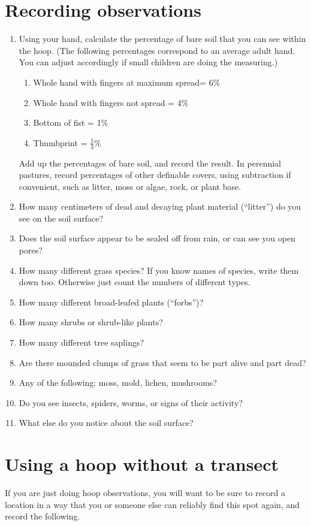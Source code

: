 \documentclass[11pt,letterpaper,twoside,onecolumn]{memoir}
\begin{document}
\section*{Recording observations}
\begin{enumerate}
\item {Using your hand, calculate the percentage of bare soil that you can see within the hoop. (The following percentages correspond to an average adult hand. You can adjust accordingly if small children are doing the measuring.) \begin{enumerate}
\item Whole hand with fingers at maximum spread= 6\%
\item Whole hand with fingers not spread = 4\%
\item Bottom of fist = 1\%
\item Thumbprint = $\frac{1}{3}$\% \end{enumerate}
Add up the percentages of bare soil, and record the result. In perennial pastures, record percentages of other definable covers, using subtraction if convenient, such as litter, moss or algae, rock, or plant base.}

\item How many centimeters of dead and decaying plant material (``litter'') do you see on the soil surface?
\item Does the soil surface appear to be sealed off from rain, or can see you open pores?
\item How many different grass species? If you know names of species, write them down too. Otherwise just count the numbers of different types.
\item How many different broad-leafed plants (``forbs'')?
\item How many shrubs or shrub-like plants?
\item How many different tree saplings?
\item Are there mounded clumps of grass that seem to be part alive and part dead?
\item Any of the following: moss, mold, lichen, mushrooms? 
\item Do you see insects, spiders, worms, or signs of their activity?
\item What else do you notice about the soil surface?
\end{enumerate}

\section*{Using a hoop without a transect}
If you are just doing hoop observations, you will want to be sure to record a location in a way that you or someone else can reliably find this spot again, and record the following.
\end{document}
